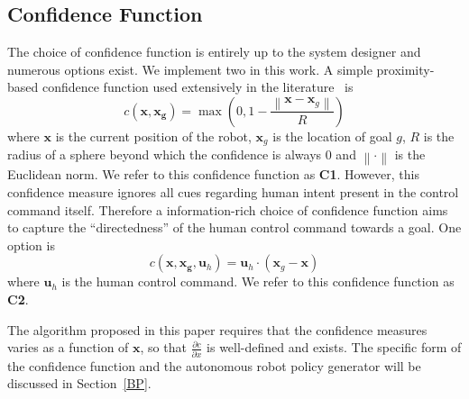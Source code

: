\documentclass[conference]{IEEEtran}
\newcommand{\norm}[1]{\left\lVert#1\right\rVert}
\begin{document}
\subsection{Confidence Function}\label{CF}
The choice of confidence function is entirely up to the system designer and numerous options exist. We implement two in this work. A simple proximity-based confidence function used extensively in the literature~\cite{dragan2013policy} is
\begin{equation*}\label{C1}
c(\boldsymbol{x}, \boldsymbol{x_g}) = \max(0, 1 - \frac{\norm{\boldsymbol{x} - \boldsymbol{x}_{g}}}{R})
\end{equation*}
where $\boldsymbol{x}$ is the current position of the robot, $\boldsymbol{x}_{g}$ is the location of goal $g$, $R$ is the radius of a sphere beyond which the confidence is always $0$ and $\norm{\cdot}$ is the Euclidean norm. We refer to this confidence function as \textbf{C1}. However, this confidence measure ignores all cues regarding human intent present in the control command itself. Therefore a information-rich choice of confidence function aims to capture the ``directedness'' of the human control command towards a goal. One option is
\begin{equation*}\label{C2}
c({\boldsymbol{x},\boldsymbol{x_g}, \boldsymbol{u}_{h}}) = \boldsymbol{u}_h\cdot(\boldsymbol{x}_{g} - \boldsymbol{x})
\end{equation*}
where $\boldsymbol{u}_h$ is the human control command. We refer to this confidence function as \textbf{C2}. 

The algorithm proposed in this paper requires that the confidence measures varies as a function of $\boldsymbol{x}$, so that $\frac{\partial c}{\partial x}$ is well-defined and exists. The specific form of the confidence function and the autonomous robot policy generator will be discussed in Section~\ref{BP}.
\end{document}
